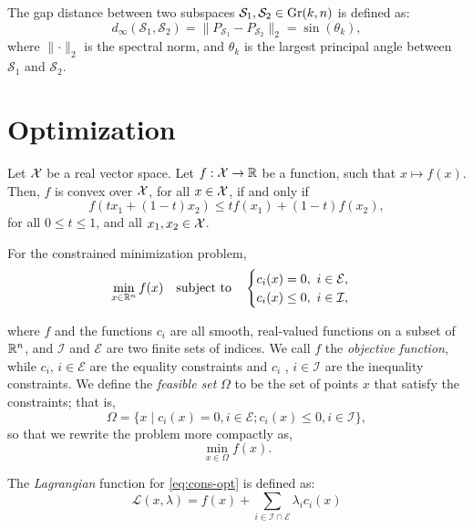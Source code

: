 \begin{definition}
    The gap distance between two subspaces $\mathcal{S}_1, \mathcal{S}_2 \in \text{Gr}(k,n)$ is defined as:
    \[
        d_{\infty}(\mathcal{S}_1, \mathcal{S}_2) = \lVert P_{\mathcal{S}_1} - P_{\mathcal{S}_2} \rVert_{2} = \sin(\theta_k),
    \]
    where $\lVert \cdot \rVert_{2}$ is the spectral norm, and $\theta_k$ is the largest principal angle between $\mathcal{S}_1$ and $\mathcal{S}_2$.
    
\end{definition}

\newpage
\section{Optimization}

\begin{definition}[Convexity]
    Let $\mathcal{X}$ be a real vector space. Let $f: \mathcal{X} \to \mathbb{R}$ be a function, such that $x \mapsto f(x)$. Then, $f$ is convex over $\mathcal{X}$, for all $x \in \mathcal{X}$, if and only if
    \[
        f(t x_1 + (1-t)x_2) \leq t f(x_1) + (1-t)f(x_2), 
    \]
    for all $0\leq t \leq 1$, and all $x_1, x_2 \in \mathcal{X}$.
\end{definition}
\begin{definition}
    For the constrained minimization problem,
    \begin{equation}\label{eq:cons-opt}
        \min_{x \in \mathbb{R}^n} f(x) \quad \textrm{subject to} \quad \begin{cases}
            c_i(x) = 0, \ i \in \mathcal{E}, \\
            c_i(x) \leq 0, \ i \in \mathcal{I},
        \end{cases}
    \end{equation}
\end{definition}
where $f$ and the functions $c_i$ are all smooth, real-valued functions on a subset of $\mathbb{R}^n$, and $\mathcal{I}$ and $\mathcal{E}$ are two finite sets of indices. We call $f$ the \emph{objective function}, while $c_i$, $i \in \mathcal{E}$ are the equality constraints and $c_i$ , $i \in \mathcal{I}$ are the inequality constraints. We define the \emph{feasible set} $\Omega$ to be the set of points $x$ that satisfy the constraints; that is,
\[
    \Omega = \{x \mid c_i(x) = 0, i \in \mathcal{E}; c_i(x) \leq 0, i \in \mathcal{I} \},
\]
so that we rewrite the problem more compactly as,
\[
    \min_{x \in \Omega} f(x).
\]
\begin{definition}
    The \emph{Lagrangian} function for \eqref{eq:cons-opt} is defined as:
    \[
        \mathcal{L}(x, \lambda) = f(x) + \sum_{i \in \mathcal{I} \cap \mathcal{E}} \lambda_i c_i(x) 
    \]
\end{definition}
